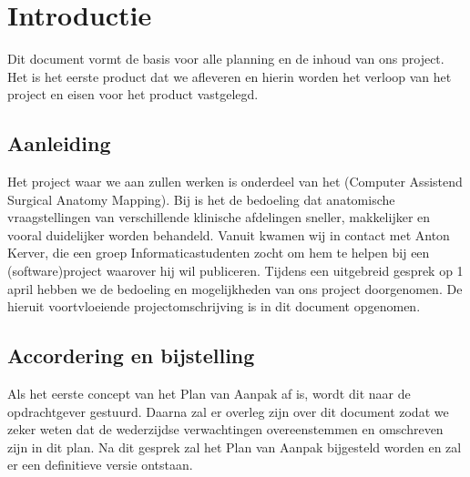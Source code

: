 \section{Introductie}

Dit document vormt de basis voor alle planning en de inhoud van ons project.
Het is het eerste product dat we afleveren en hierin worden het verloop van het project en eisen voor het product vastgelegd.

\subsection{Aanleiding}

Het project waar we aan zullen werken is onderdeel van het \casamproject (Computer Assistend Surgical Anatomy Mapping). 
Bij \casam is het de bedoeling dat anatomische vraagstellingen van verschillende klinische afdelingen sneller, makkelijker en vooral duidelijker worden behandeld.
Vanuit \casam kwamen wij in contact met Anton Kerver, die een groep Informaticastudenten zocht om hem te helpen bij een (software)project waarover hij wil publiceren.
Tijdens een uitgebreid gesprek op 1 april hebben we de bedoeling en mogelijkheden van ons project doorgenomen.
De hieruit voortvloeiende projectomschrijving is in dit document opgenomen.

\subsection{Accordering en bijstelling}

Als het eerste concept van het Plan van Aanpak af is, wordt dit naar de opdrachtgever gestuurd.
Daarna zal er overleg zijn over dit document zodat we zeker weten dat de wederzijdse verwachtingen overeenstemmen en omschreven zijn in dit plan.
Na dit gesprek zal het Plan van Aanpak bijgesteld worden en zal er een definitieve versie ontstaan.

